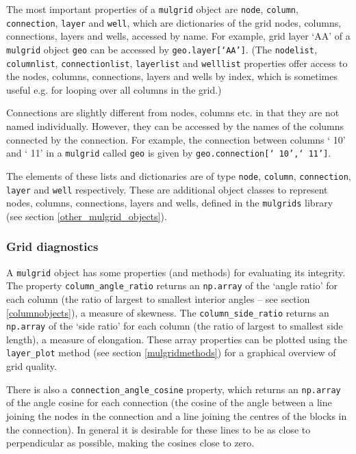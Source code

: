 The most important properties of a \texttt{mulgrid} object are \texttt{node}, \texttt{column}, \texttt{connection}, \texttt{layer} and \texttt{well}, which are dictionaries of the grid nodes, columns, connections, layers and wells, accessed by name.  For example, grid layer `AA' of a \texttt{mulgrid} object \texttt{geo} can be accessed by \texttt{geo.layer[`AA']}.  (The \texttt{nodelist}, \texttt{columnlist}, \texttt{connectionlist}, \texttt{layerlist} and \texttt{welllist} properties offer access to the nodes, columns, connections, layers and wells by index, which is sometimes useful e.g. for looping over all columns in the grid.)

Connections are slightly different from nodes, columns etc. in that they are not named individually.  However, they can be accessed by the names of the columns connected by the connection.  For example, the connection between columns ` 10' and ` 11' in a \texttt{mulgrid} called \texttt{geo} is given by \texttt{geo.connection[` 10',` 11']}.

The elements of these lists and dictionaries are of type \texttt{node}, \texttt{column}, \texttt{connection}, \texttt{layer} and \texttt{well} respectively.  These are additional object classes to represent nodes, columns, connections, layers and wells, defined in the \texttt{mulgrids} library (see section \ref{other_mulgrid_objects}).

\subsubsection{Grid diagnostics}

A \texttt{mulgrid} object has some properties (and methods) for evaluating its integrity.  The property \texttt{column\_angle\_ratio} returns an \texttt{np.array} of the `angle ratio' for each column (the ratio of largest to smallest interior angles -- see section \ref{columnobjects}), a measure of skewness.  The \texttt{column\_side\_ratio} returns an \texttt{np.array} of the `side ratio' for each column (the ratio of largest to smallest side length), a measure of elongation.  These array properties can be plotted using the \texttt{layer\_plot} method (see section \ref{mulgridmethods}) for a graphical overview of grid quality.

There is also a \texttt{connection\_angle\_cosine} property, which returns an \texttt{np.array} of the angle cosine for each connection (the cosine of the angle between a line joining the nodes in the connection and a line joining the centres of the blocks in the connection).  In general it is desirable for these lines to be as close to perpendicular as possible, making the cosines close to zero.

